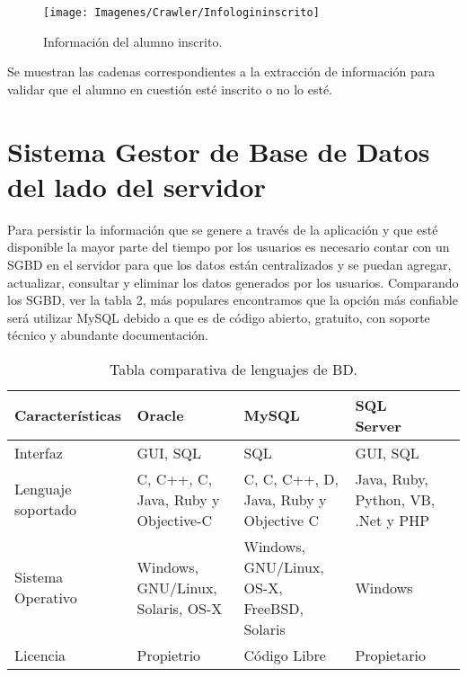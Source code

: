 	\begin{figure} [hbt!]
		\centering
		\texttt{[image: Imagenes/Crawler/Infologininscrito]}
		\caption{Información del alumno inscrito.}
		\label{infologininscrito}
	\end{figure}
	\noindent Se muestran las cadenas correspondientes a la extracción de información para validar que el alumno en cuestión esté inscrito o no lo esté.
	
	
	\section{Sistema Gestor de Base de Datos del lado del servidor}
	\noindent Para persistir la información que se genere a través de la aplicación y que esté disponible la mayor parte del tiempo por los usuarios es necesario contar con un SGBD en el servidor para que los datos están centralizados y se puedan agregar, actualizar, consultar y eliminar los datos generados por los usuarios. Comparando los SGBD, ver la tabla 2, más populares encontramos que la opción más confiable será utilizar MySQL debido a que es de código abierto, gratuito, con soporte técnico y abundante documentación. 
	
	\begin{table}[htbp]
		\begin{center}
			\begin{tabular}{|l|p{35mm}|p{35mm}|p{35mm}|l}
				\hline
				Caracter\'isticas & Oracle & MySQL & SQL Server \\
				\hline 
				Interfaz & GUI, SQL & SQL & GUI, SQL \\ \hline
				Lenguaje soportado & C, C++, C, Java, Ruby y Objective-C & C, C, C++, D, Java, Ruby y Objective C & Java, Ruby, Python, VB, .Net y PHP  \\ \hline
				Sistema Operativo & Windows, GNU/Linux, Solaris, OS-X & Windows, GNU/Linux, OS-X, FreeBSD, Solaris & Windows \\ \hline
				Licencia & Propietrio & Código Libre & Propietario \\ \hline
			\end{tabular}
			\caption{Tabla comparativa de lenguajes de BD.}
			\label{tablaServidor}
		\end{center}
	\end{table}
	
